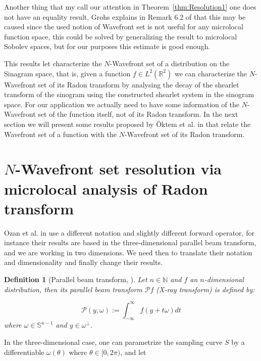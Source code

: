 \documentclass[a4paper]{article}
\newtheorem{definition}{Definition}
\begin{document}
\bigskip

Another thing that my call our attention in Theorem~\ref{thm:Resolution1} one does not have an equality result, Grohs explains in Remark 6.2 of \cite{WaveFrontSetGrohs} that this may be caused since the used notion of Wavefront set is not useful for any microlocal function space, this could be solved by generalizing the result to microlocal Sobolev spaces, but for our purposes this estimate is good enough.

\bigskip

This results let characterize the $N$-Wavefront set of a distribution on the Sinagram space, that is, given a function $f\in L^2(\mathbb{R}^2)$ we can characterize the $N$-Wavefront set of its Radon transform by analysing the decay of the shearlet transform of the sinogram using the constructed shearlet system in the sinogram space. For our application we actually need to have some information of the $N$-Wavefront set of the function itself, not of its Radon transform. In the next section we will present some results proposed by \"Oktem et al. in \cite{Ozan-tomography} that relate the Wavefront set of a function with the $N$-Wavefront set of its Radon transform.

\section{$N$-Wavefront set resolution via microlocal analysis of Radon transform}

Ozan et al. in \cite{Ozan-tomography} use a different notation and slightly different forward operator, for instance their results are based in the three-dimensional parallel beam transform, and we are working in two dimensions. We need then to translate their notation and dimensionality and finally change their results.

\bigskip

\begin{definition}[Parallel beam transform, \cite{Ozan-tomography}]
Let $n\in \mathbb{N}$ and $f$ an $n$-dimensional distribution, then its parallel beam transform $\mathcal{P}f$ (X-ray transform) is defined by:

$$
\mathcal{P}(y,\omega):= \int_{-\infty}^{\infty}f(y+t\omega)dt
$$
where $\omega\in\mathbb{S}^{n-1}$ and $y\in \omega^{\perp}$.
\end{definition}

\bigskip

In the three-dimensional case, one can parametrize the sampling curve $S$ by a differentiable  $\omega(\theta)$ where $\theta\in [0,2\pi)$, and let 
\end{document}
